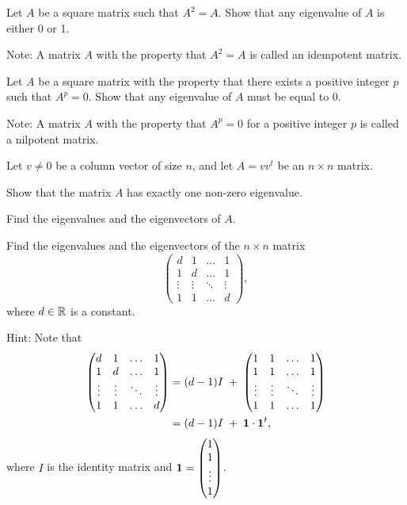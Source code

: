 \begin{exercises}
\item Let $A$ be a square matrix such that $A^2 = A$. Show that any
eigenvalue of $A$ is either 0 or 1.

\noindent Note: A matrix $A$ with the property that $A^2 = A$ is called an
idempotent matrix.

\item Let $A$ be a square matrix with the property that there exists a
positive integer $p$ such that $A^p = 0$. Show that any eigenvalue of $A$
must be equal to 0.

\noindent Note: A matrix $A$ with the property that $A^p = 0$ for a positive
integer $p$ is called a nilpotent matrix.

\item Let $v \neq 0$ be a column vector of size $n$, and let $A = vv^t$ be an
$n \times n$ matrix.
\begin{subparts}
\item Show that the matrix $A$ has exactly one non-zero eigenvalue.
\item Find the eigenvalues and the eigenvectors of $A$.
\end{subparts}

\item Find the eigenvalues and the eigenvectors of the $n \times n$ matrix
\[
\begin{pmatrix} d & 1 & \dots & 1\\ 1 & d & \dots & 1\\ \vdots & \vdots & \ddots & \vdots\\ 1 & 1 & \dots & d \end{pmatrix},
\]
where $d \in \mathbb{R}$ is a constant.

\noindent Hint: Note that
\begin{align*}
\begin{pmatrix} d & 1 & \dots & 1\\ 1 & d & \dots & 1\\ \vdots & \vdots & \ddots & \vdots\\ 1 & 1 & \dots & d \end{pmatrix}
&= (d-1)I \;+\; \begin{pmatrix} 1 & 1 & \dots & 1\\ 1 & 1 & \dots & 1\\ \vdots & \vdots & \ddots & \vdots\\ 1 & 1 & \dots & 1 \end{pmatrix}\\
&= (d-1)I \;+\; \mathbf{1} \cdot \mathbf{1}^t,
\end{align*}
where $I$ is the identity matrix and $\mathbf{1} = \begin{pmatrix} 1\\ 1\\ \vdots\\ 1 \end{pmatrix}$.


\end{exercises}
